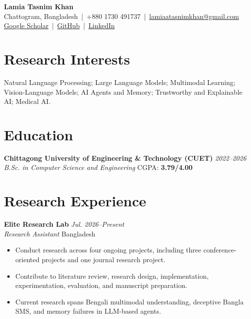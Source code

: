 \documentclass[a4paper,11pt]{article}
\newcommand{\entry}[4]{
  \textbf{#1} \hfill \textit{#4}\\
  \textit{#2} \hfill #3\\[-0.25em]
}
\begin{document}
\begin{center}
    {\LARGE \textbf{Lamia Tasnim Khan}}\\[4pt]
    Chattogram, Bangladesh \,|\, 
    +880 1730 491737 \,|\, 
    \href{mailto:lamiaatasnimkhan@gmail.com}{lamiaatasnimkhan@gmail.com}\\[3pt]
    \href{https://scholar.google.com/citations?hl=en\&user=4jSQnsoAAAAJ}{Google Scholar}
    \,|\, 
    \href{https://github.com/lamiatasnimkhan}{GitHub}
    \,|\, 
    \href{https://www.linkedin.com/in/lamia-tasnim-khan-02b548227/}{LinkedIn}
\end{center}

\section*{Research Interests}

Natural Language Processing; Large Language Models; Multimodal Learning;
Vision-Language Models; AI Agents and Memory; Trustworthy and Explainable AI;
Medical AI.

\section*{Education}

\entry
{Chittagong University of Engineering \& Technology (CUET)}
{B.Sc. in Computer Science and Engineering}
{CGPA: \textbf{3.79/4.00}}
{2022--2026}

\section*{Research Experience}

\entry
{Elite Research Lab}
{Research Assistant}
{Bangladesh}
{Jul. 2026--Present}

\begin{itemize}
    \item Conduct research across four ongoing projects, including three
    conference-oriented projects and one journal research project.
    \item Contribute to literature review, research design, implementation,
    experimentation, evaluation, and manuscript preparation.
    \item Current research spans Bengali multimodal understanding, deceptive
    Bangla SMS, and memory failures in LLM-based agents.
\end{itemize}
\end{document}
